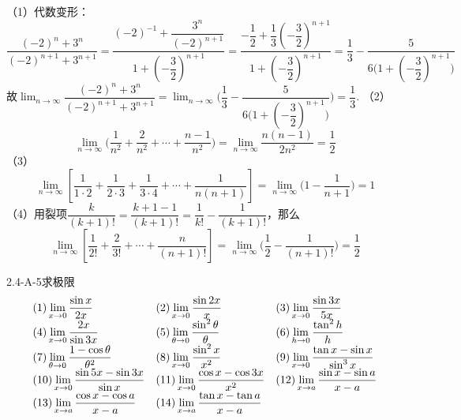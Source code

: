 \begin{solution}
    （1）代数变形：
    \[\displaystyle\dfrac{(-2)^n+3^n}{(-2)^{n+1}+3^{n+1}}=\dfrac{(-2)^{-1}+\dfrac{3^n}{(-2)^{n+1}}}{1+(-\dfrac32)^{n+1}}=\dfrac{-\dfrac12+\dfrac13(-\dfrac32)^{n+1}}{1+(-\dfrac32)^{n+1}}=\dfrac13-\dfrac{5}{6\bigg(1+(-\dfrac32)^{n+1}\bigg)}\]
    故$\displaystyle\lim_{n\to\infty}\dfrac{(-2)^n+3^n}{(-2)^{n+1}+3^{n+1}}=\lim_{n\to\infty}\bigg(\dfrac13-\dfrac{5}{6\bigg(1+(-\dfrac32)^{n+1}\bigg)}\bigg)=\dfrac13$.\newline
    （2）\[\lim_{n\to\infty}\bigg(\dfrac{1}{n^2}+\dfrac{2}{n^2}+\cdots+\dfrac{n-1}{n^2}\bigg)=\lim_{n\to\infty}\dfrac{n(n-1)}{2n^2}=\dfrac12\]
    （3）\[\displaystyle\lim_{n\to\infty}\left[\dfrac{1}{1\cdot 2}+\dfrac{1}{2\cdot3}+\dfrac{1}{3\cdot4}+\cdots+\dfrac{1}{n(n+1)}\right]=\lim_{n\to\infty}\bigg(1-\dfrac{1}{n+1}\bigg)=1\]
    （4）用裂项$\dfrac{k}{(k+1)!}=\dfrac{k+1-1}{(k+1)!}=\dfrac{1}{k!}-\dfrac{1}{(k+1)!}$，那么
    \[\displaystyle\lim_{n\to\infty}\left[\dfrac{1}{2!}+\dfrac{2}{3!}+\cdots+\dfrac{n}{(n+1)!}\right]=\lim_{n\to\infty}\bigg(\dfrac12-\dfrac{1}{(n+1)!}\bigg)=\dfrac12\]
\end{solution}
\begin{example}{2.4-A-5}{求极限}
\vspace{-5pt}\[
\begin{array}{l@{\quad}l@{\quad}l}
(1) \displaystyle\lim_{x\to 0}\dfrac{\sin x}{2x}         & (2) \displaystyle\lim_{x\to 0}\dfrac{\sin 2x}{x}          & (3) \displaystyle\lim_{x\to 0}\dfrac{\sin 3x}{5x} \\
(4) \displaystyle\lim_{x\to 0}\dfrac{2x}{\sin 3x}        & (5) \displaystyle\lim_{\theta\to 0}\dfrac{\sin^2 \theta}{\theta} & (6) \displaystyle\lim_{h\to 0}\dfrac{\tan^2 h}{h} \\
(7) \displaystyle\lim_{\theta\to 0}\dfrac{1-\cos \theta}{\theta^2} & (8) \displaystyle\lim_{x\to 0}\dfrac{\sin^2 x}{x^2} & (9) \displaystyle\lim_{x\to 0}\dfrac{\tan x-\sin x}{\sin^3 x} \\
(10) \displaystyle\lim_{x\to 0}\dfrac{\sin 5x-\sin 3x}{\sin x} & (11) \displaystyle\lim_{x\to 0}\dfrac{\cos x-\cos 3x}{x^2} & (12) \displaystyle\lim_{x\to a}\dfrac{\sin x-\sin a}{x-a} \\
(13) \displaystyle\lim_{x\to a}\dfrac{\cos x-\cos a}{x-a} & (14) \displaystyle\lim_{x\to a}\dfrac{\tan x-\tan a}{x-a} & \\
\end{array}
\]
\end{example}
